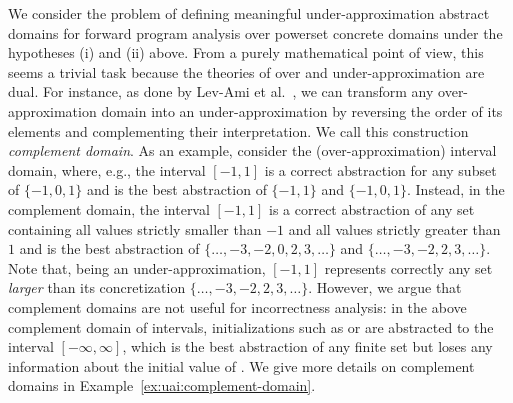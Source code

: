 We consider the problem of defining meaningful under-approximation abstract domains for forward program analysis over powerset concrete domains under the hypotheses (i) and (ii) above.
%			
%			
From a purely mathematical point of view, this seems a trivial task because the theories of over and under-approximation are dual.
For instance, as done by Lev-Ami et al.~\cite{LSRG07}, we can transform any over-approximation domain into an under-approximation by reversing the order of its elements and complementing their interpretation. We call this construction \emph{complement domain}.
As an example, consider the (over-approximation) interval domain, where, e.g., the interval $[-1,1]$ is a correct abstraction for any subset of $\{ -1, 0, 1 \}$ and is the best abstraction of $\{ -1, 1 \}$ and $\{ -1, 0, 1 \}$. Instead, in the complement domain, the interval $[-1,1]$ is a correct abstraction of any set containing all values strictly smaller than $-1$ and all values strictly greater than $1$ and is the best abstraction of $\{ \dots, -3, -2, 0, 2, 3, \dots \}$ and $\{ \dots, -3, -2, 2, 3, \dots \}$. Note that, being an under-approximation, $[-1, 1]$ represents correctly any set \emph{larger} than its concretization $\{ \dots, -3, -2, 2, 3, \dots \}$.
However, we argue that complement domains are not useful for incorrectness analysis: in the above complement domain of intervals, initializations such as  or  are abstracted to the interval $[-\infty,\infty]$, which is the best abstraction of any finite set but loses any information about the initial value of . We give more details on complement domains in Example~\ref{ex:uai:complement-domain}.

